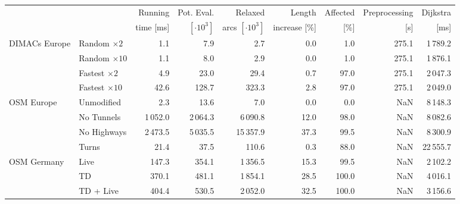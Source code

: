 \begin{tabular}{llrrrrrrr}
\toprule
 & &   Running &     Pot. Eval. &             Relaxed &        Length & Affected & Preprocessing & Dijkstra \\ & & time [ms] & $[\cdot 10^3]$ & arcs $[\cdot 10^3]$ & increase [\%] &     [\%] &           [s] &     [ms] \\
\midrule
DIMACs Europe & Random $\times 2$ &              1.1 &            7.9 &               2.7 &       0.0 &       1.0 &                         275.1 &                    1\,789.2 \\
        & Random $\times 10$ &              1.1 &            8.0 &               2.9 &       0.0 &       1.0 &                         275.1 &                    1\,876.1 \\
        & Fastest $\times 2$ &              4.9 &           23.0 &              29.4 &       0.7 &      97.0 &                         275.1 &                    2\,047.3 \\
        & Fastest $\times 10$ &             42.6 &          128.7 &             323.3 &       2.8 &      97.0 &                         275.1 &                    2\,049.0 \\
\addlinespace
OSM Europe & Unmodified &              2.3 &           13.6 &               7.0 &       0.0 &       0.0 &                           NaN &                    8\,148.3 \\
        & No Tunnels &           1\,052.0 &         2\,064.3 &            6\,090.8 &      12.0 &      98.0 &                           NaN &                    8\,082.6 \\
        & No Highways &           2\,473.5 &         5\,035.5 &           15\,357.9 &      37.3 &      99.5 &                           NaN &                    8\,300.9 \\
        & Turns &             21.4 &           37.5 &             110.6 &       0.3 &      88.0 &                           NaN &                   22\,555.7 \\
\addlinespace
OSM Germany & Live &            147.3 &          354.1 &            1\,356.5 &      15.3 &      99.5 &                           NaN &                    2\,102.2 \\
        & TD &            370.1 &          481.1 &            1\,854.1 &      28.5 &     100.0 &                           NaN &                    4\,016.1 \\
        & TD + Live &            404.4 &          530.5 &            2\,052.0 &      32.5 &     100.0 &                           NaN &                    3\,156.6 \\

\end{tabular}

